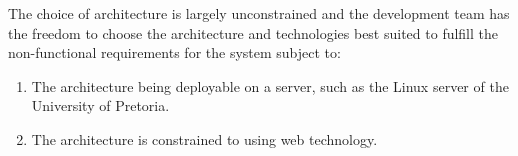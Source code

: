 \begin{flushleft}The choice of architecture is largely unconstrained and the development team has the freedom to
choose the architecture and technologies best suited to fulfill the non-functional requirements for
the system subject to:
\end{flushleft}
\begin{enumerate}
\item The architecture being deployable on a server, such as the Linux server of the University of Pretoria.
\item The architecture is constrained to using web technology.
\end{enumerate}